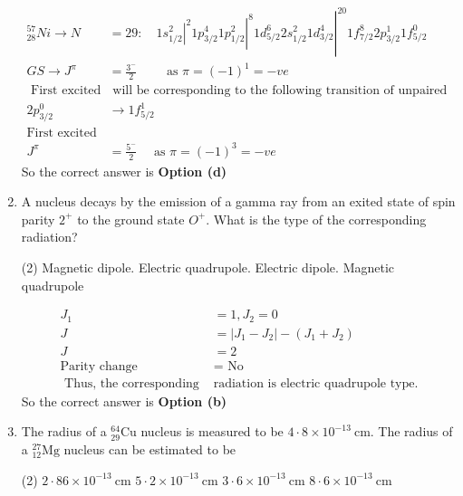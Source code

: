 \begin{enumerate}
\begin{answer}
$$\begin{aligned}
	{ }_{28}^{57} N i \rightarrow N&=29:\left.\left.\left.\quad 1 s_{1 / 2}^2\right|^2 1 p_{3 / 2}^4 1 p_{1 / 2}^2\right|^8 1 d_{5 / 2}^6 2 s_{1 / 2}^2 1 d_{3 / 2}^4\right|^{20} 1 f_{7 / 2}^8 2 p_{3 / 2}^1 1 f_{5 / 2}^0\\
	G S \rightarrow J^\pi&=\frac{3^{-}}{2} \qquad \text { as } \pi=(-1)^1=-v e\\
\text { First excited state}&\text{ will be corresponding to the following transition of unpaired neutron }\\
2 p_{3 / 2}^0 &\longrightarrow 1 f_{5 / 2}^1\\
\text{First excited state}\\
J^\pi&=\frac{5^{-}}{2} \quad \text { as } \pi=(-1)^3=-v e
\end{aligned}
$$
So the correct answer is \textbf{Option (d)}
\end{answer}
	\item  A nucleus decays by the emission of a gamma ray from an exited state of spin parity $2^{+}$ to the ground state $O^{+}$. What is the type of the corresponding radiation?
	 \begin{tasks}(2)
		\task[\textbf{a.}] Magnetic dipole.
		\task[\textbf{b.}]Electric quadrupole.
		\task[\textbf{c.}]Electric dipole.
		\task[\textbf{d.}] Magnetic quadrupole
	\end{tasks}
\begin{answer}
	$$
	\begin{aligned}
	J_1&=1, J_2=0\\
	J&=\left|J_1-J_2\right|-\left(J_1+J_2\right) \\
	J&=2\\
	\text{Parity change }&=\text{ No}\\
\text{	Thus, the corresponding }&\text{radiation is electric quadrupole type.}
\end{aligned}
$$
So the correct answer is \textbf{Option (b)}
\end{answer}
	\item The radius of a ${ }_{29}^{64} \mathrm{Cu}$ nucleus is measured to be $4 \cdot 8 \times 10^{-13} \mathrm{~cm}$. The radius of a ${ }_{12}^{27} \mathrm{Mg}$ nucleus can be estimated to be
	 \begin{tasks}(2)
		\task[\textbf{a.}]$2 \cdot 86 \times 10^{-13} \mathrm{~cm}$
		\task[\textbf{b.}] $5 \cdot 2 \times 10^{-13} \mathrm{~cm}$
		\task[\textbf{c.}] $3 \cdot 6 \times 10^{-13} \mathrm{~cm}$
		\task[\textbf{d.}] $8 \cdot 6 \times 10^{-13} \mathrm{~cm}$
	\end{tasks}
\begin{answer}

\end{answer}
\end{enumerate}
